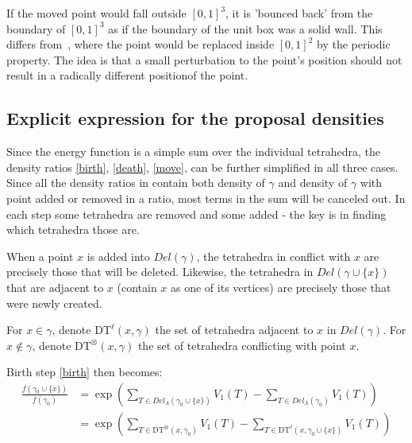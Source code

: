 \documentclass[12pt,a4paper]{report}
\begin{document}

If the moved point would fall outside $[0,1]^3$, it is  'bounced back' from the boundary of $[0,1]^3$ as if the boundary of the unit box was a solid wall. 
This differs from~\cite{DL10}, where the point would be replaced inside $[0,1]^2$ by the periodic property. 
The idea is that a small perturbation to the point's position should not result in a radically different positionof the point. 


\subsection{Explicit expression for the proposal densities}

Since the energy function is a simple sum over the individual tetrahedra, the density ratios \ref{birth}, \ref{death}, \ref{move}, can be further simplified in all three cases. Since all the density ratios in contain both density of $\gamma$ and density of $\gamma$ with point added or removed in a ratio, most terms in the sum will be canceled out. In each step some tetrahedra are removed and some added - the key is in finding which tetrahedra those are. 

When a point $x$ is added into $Del(\gamma)$, the tetrahedra in conflict with $x$ are precisely those that will be deleted. Likewise, the tetrahedra in $Del(\gamma\cup\{x\})$ that are adjacent to $x$ (contain $x$ as one of its vertices) are precisely those that were newly created.

For $x\in \gamma$, denote $\text{DT}^\ell(x,\gamma)$ the set of tetrahedra adjacent to $x$ in $Del(\gamma)$. For $x \notin \gamma$, denote $\text{DT}^\otimes (x,\gamma)$ the set of tetrahedra conflicting with point $x$. 



Birth step \ref{birth} then becomes:
\begin{align*}
\frac{f(\gamma_0 \cup \{x\})}{f(\gamma_0)} &= \exp\left({\sum_{T\in Del_\Lambda(\gamma_0 \cup \{x\})} V_1(T) - \sum_{T \in Del_\Lambda(\gamma_0)}V_1(T)}\right) \\
&= \exp\left(  \sum_{T \in \text{DT}^\otimes (x,\gamma_0)} V_1(T)  - \sum_{T\in \text{DT}^\ell (x,\gamma_0\cup\{x\})} V_1(T) \right)  
\end{align*}
\end{document}
